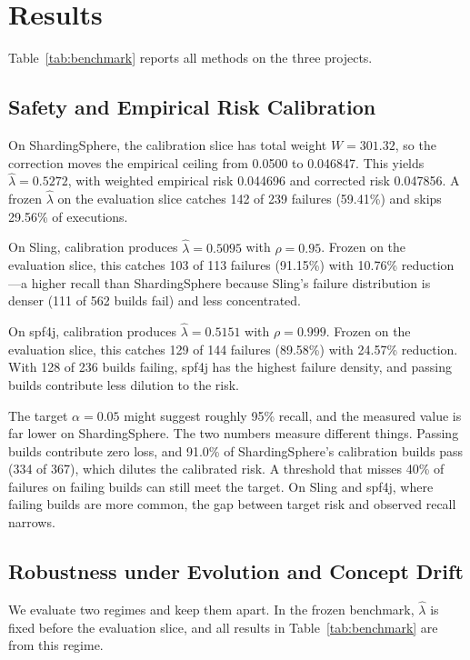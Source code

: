 \section{Results}
\label{sec:results}



Table~\ref{tab:benchmark} reports all methods on the three projects.

\subsection{Safety and Empirical Risk Calibration}
\label{sec:rq1}

On ShardingSphere, the calibration slice has total weight $W = 301.32$, so the correction moves the empirical ceiling from 0.0500 to 0.046847. This yields $\hat\lambda = 0.5272$, with weighted empirical risk 0.044696 and corrected risk 0.047856. A frozen $\hat\lambda$ on the evaluation slice catches 142 of 239 failures (59.41\%) and skips 29.56\% of executions.

On Sling, calibration produces $\hat\lambda = 0.5095$ with $\rho = 0.95$. Frozen on the evaluation slice, this catches 103 of 113 failures (91.15\%) with 10.76\% reduction---a higher recall than ShardingSphere because Sling's failure distribution is denser (111 of 562 builds fail) and less concentrated.

On spf4j, calibration produces $\hat\lambda = 0.5151$ with $\rho = 0.999$. Frozen on the evaluation slice, this catches 129 of 144 failures (89.58\%) with 24.57\% reduction. With 128 of 236 builds failing, spf4j has the highest failure density, and passing builds contribute less dilution to the risk.

The target $\alpha = 0.05$ might suggest roughly 95\% recall, and the measured value is far lower on ShardingSphere. The two numbers measure different things. Passing builds contribute zero loss, and 91.0\% of ShardingSphere's calibration builds pass (334 of 367), which dilutes the calibrated risk. A threshold that misses 40\% of failures on failing builds can still meet the target. On Sling and spf4j, where failing builds are more common, the gap between target risk and observed recall narrows.

\subsection{Robustness under Evolution and Concept Drift}
\label{sec:rq2}

We evaluate two regimes and keep them apart. In the frozen benchmark, $\hat\lambda$ is fixed before the evaluation slice, and all results in Table~\ref{tab:benchmark} are from this regime.

